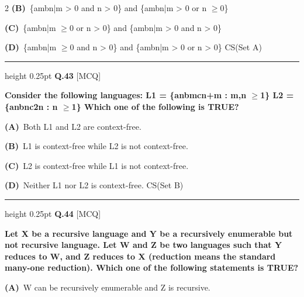 \documentclass[a4paper,10pt,twoside]{article}
\begin{document}
\begin{multicols}{2}
\textbf{(B)}~\{ambn|m > 0 and n > 0\} and \{ambn|m > 0 or n $\ge$0\}\par\vspace{2pt}\noindent
\textbf{(C)}~\{ambn|m $\ge$0 or n > 0\} and \{ambn|m > 0 and n > 0\}\par\vspace{2pt}\noindent
\textbf{(D)}~\{ambn|m $\ge$0 and n > 0\} and \{ambn|m > 0 or n > 0\} \newline CS(Set A)
\par\vspace{6pt}\hrule height 0.25pt\vspace{6pt}
\noindent\textbf{Q.43} \hfill {\footnotesize\textsf{[MCQ]}}
\par\vspace{2pt}
{\bfseries Consider the following languages:
L1 = \{anbmcn+m : m,n $\ge$1\}
L2 = \{anbnc2n : n $\ge$1\}
Which one of the following is TRUE? \par}
\par\vspace{2pt}\noindent
\textbf{(A)}~Both L1 and L2 are context-free.\par\vspace{2pt}\noindent
\textbf{(B)}~L1 is context-free while L2 is not context-free.\par\vspace{2pt}\noindent
\textbf{(C)}~L2 is context-free while L1 is not context-free.\par\vspace{2pt}\noindent
\textbf{(D)}~Neither L1 nor L2 is context-free. \newline CS(Set B)
\par\vspace{6pt}\hrule height 0.25pt\vspace{6pt}
\noindent\textbf{Q.44} \hfill {\footnotesize\textsf{[MCQ]}}
\par\vspace{2pt}
{\bfseries Let X be a recursive language and Y be a recursively enumerable but not recursive language.
Let W and Z be two languages such that Y reduces to W, and Z reduces to X (reduction means
the standard many-one reduction). Which one of the following statements is TRUE? \par}
\par\vspace{2pt}\noindent
\textbf{(A)}~W can be recursively enumerable and Z is recursive.\par\vspace{2pt}\noindent

\end{multicols}
\end{document}
